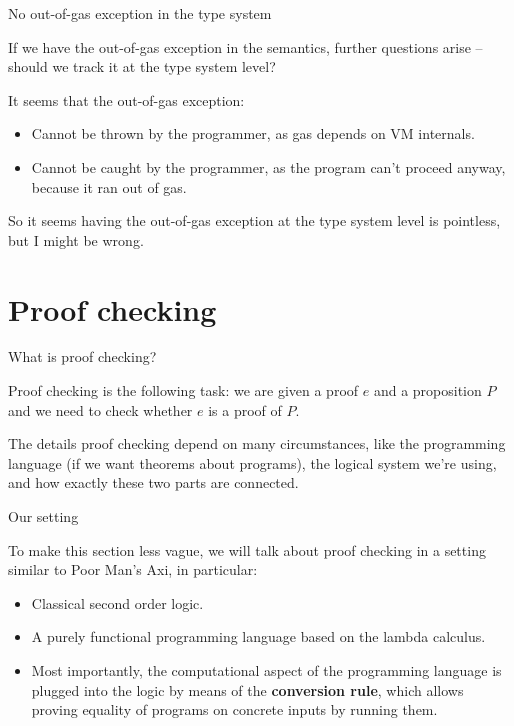 \documentclass{beamer}
\begin{document}
\begin{frame}{No out-of-gas exception in the type system}

If we have the out-of-gas exception in the semantics, further questions arise -- should we track it at the type system level?

\vspace{2em}

It seems that the out-of-gas exception:
\begin{itemize}
  \item Cannot be thrown by the programmer, as gas depends on VM internals.
  \item Cannot be caught by the programmer, as the program can't proceed anyway, because it ran out of gas.
\end{itemize}

\vspace{2em}

So it seems having the out-of-gas exception at the type system level is pointless, but I might be wrong.

\end{frame}

\section{Proof checking}

\begin{frame}{What is proof checking?}

Proof checking is the following task: we are given a proof $e$ and a proposition $P$ and we need to check whether $e$ is a proof of $P$.

\vspace{2em}

The details proof checking depend on many circumstances, like the programming language (if we want theorems about programs), the logical system we're using, and how exactly these two parts are connected.

\end{frame}

\begin{frame}{Our setting}

To make this section less vague, we will talk about proof checking in a setting similar to Poor Man's Axi, in particular:

\begin{itemize}
  \item Classical second order logic.
  \item A purely functional programming language based on the lambda calculus.
  \item Most importantly, the computational aspect of the programming language is plugged into the logic by means of the \textbf{conversion rule}, which allows proving equality of programs on concrete inputs by running them.
\end{itemize}

\end{frame}
\end{document}
